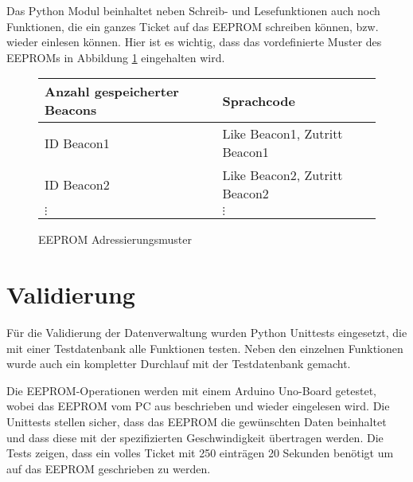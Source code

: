 Das Python Modul beinhaltet neben Schreib- und Lesefunktionen auch noch Funktionen, die ein ganzes Ticket auf das EEPROM schreiben können, bzw. wieder einlesen können.
Hier ist es wichtig, dass das vordefinierte Muster des EEPROMs in Abbildung \ref{eeprom_memory_pattern} eingehalten wird.


\begin{figure}
	\begin{tabular}{l|l}
		Anzahl gespeicherter Beacons & Sprachcode    \\ \hline
		ID Beacon1 & Like Beacon1, Zutritt Beacon1   \\ \hline
		ID Beacon2 & Like Beacon2, Zutritt Beacon2   \\ \hline
		\(\vdots\) & \(\vdots\) 
	\end{tabular}
	\caption{EEPROM Adressierungsmuster}
	\label{eeprom_memory_pattern}
\end{figure}

\section{Validierung}
Für die Validierung der Datenverwaltung wurden Python Unittests eingesetzt, die mit einer Testdatenbank alle Funktionen testen.
Neben den einzelnen Funktionen wurde auch ein kompletter Durchlauf mit der Testdatenbank gemacht.

Die EEPROM-Operationen werden mit einem Arduino Uno-Board getestet, wobei das EEPROM vom PC aus beschrieben und wieder eingelesen wird.
Die Unittests stellen sicher, dass das EEPROM die gewünschten Daten beinhaltet und dass diese mit der spezifizierten Geschwindigkeit übertragen werden.
Die Tests zeigen, dass ein volles Ticket mit 250 einträgen 20 Sekunden benötigt um auf das EEPROM geschrieben zu werden.


